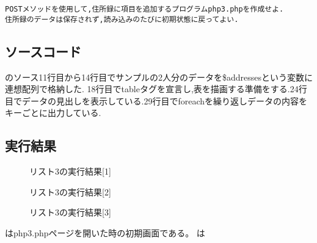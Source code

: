 \documentclass[a4j,10pt]{jsarticle}
\begin{document}
\begin{verbatim}
POSTメソッドを使用して,住所録に項目を追加するプログラムphp3.phpを作成せよ.
住所録のデータは保存されず,読み込みのたびに初期状態に戻ってよい.
\end{verbatim}
\subsection{ソースコード}



のソース11行目から14行目でサンプルの2人分のデータを\$addressesという変数に連想配列で格納した.
18行目でtableタグを宣言し,表を描画する準備をする.24行目でデータの見出しを表示している.29行目でforeachを繰り返しデータの内容をキーごとに出力している.

\subsection{実行結果}

\begin{figure}[H]
  \centering
  \caption{リスト3の実行結果[1]}
\label{fig:fig3}
\end{figure}

\begin{figure}[H]
  \centering
  \caption{リスト3の実行結果[2]}
\label{fig:fig4}
\end{figure}

\begin{figure}[H]
  \centering
  \caption{リスト3の実行結果[3]}
\label{fig:fig5}
\end{figure}

はphp3.phpページを開いた時の初期画面である。
は
\end{document}
